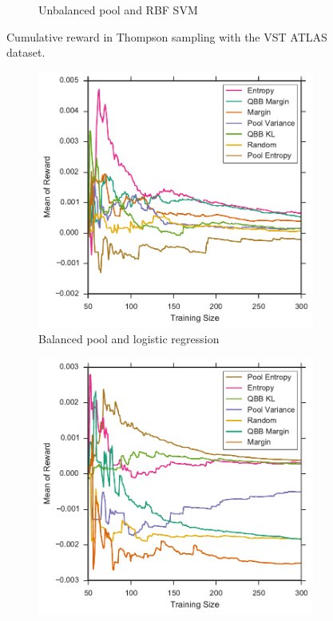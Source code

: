 \begin{figure}[p]
\begin{subfigure}{.5\textwidth}
		\caption{Unbalanced pool and RBF SVM}
		\label{fig:vstatlas_ur_sum_rewards}
	\end{subfigure}
	\caption[Cumulative reward of heuristics (VST ATLAS)]{
		Cumulative reward in Thompson sampling with the VST ATLAS dataset.}
	\label{fig:vstatlas_sum_rewards}
\end{figure}


\begin{figure}[p]
	\centering
	\begin{subfigure}{.5\textwidth}
		\centering
		\includegraphics[width=\textwidth]{figures/5_thompson/vstatlas_bl_avg_rewards}
		\caption{Balanced pool and logistic regression}
		\label{fig:vstatlas_bl_avg_rewards}
	\end{subfigure}%
	\begin{subfigure}{.5\textwidth}
		\centering
		\includegraphics[width=\linewidth]{figures/5_thompson/vstatlas_br_avg_rewards}

\end{subfigure}
\end{figure}
